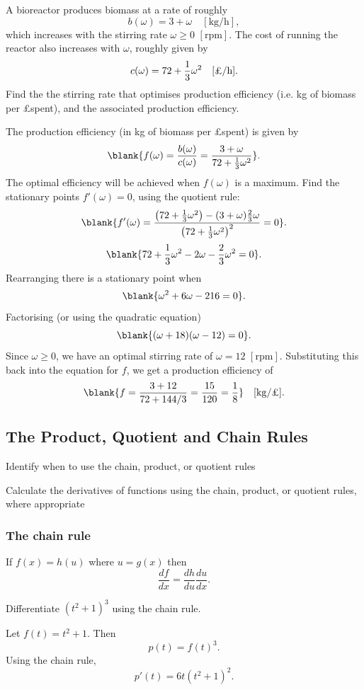 \begin{example}[Video]
A bioreactor produces biomass at a rate of roughly
\[
b(\omega)=3+\omega \quad [\mathrm{kg/h}],
\]
which increases with the stirring rate $\omega\geq0$ $[\mathrm{rpm}]$.
The cost of running the reactor also increases with $\omega$, roughly given by
\[
c(\omega)=72+\frac{1}{3}\omega^2 \quad [\text{\pounds}/\mathrm{h}].
\]
Find the the stirring rate that optimises production efficiency (i.e. kg of biomass per \pounds spent), and the associated production efficiency.
\end{example}
\begin{solution}
The production efficiency (in kg of biomass per \pounds spent) is given by
\[
\blank{f(\omega)=\frac{b(\omega)}{c(\omega)}=\frac{3+\omega}{72+\frac{1}{3}\omega^2}}.
\]
The optimal efficiency will be achieved when $f(\omega)$ is a maximum.
Find the stationary points $f'(\omega)=0$, using the quotient rule:
\[
\blank{f'(\omega)=\frac{\left(72+\frac{1}{3}\omega^2\right)-(3+\omega)\frac{2}{3}\omega}{\left(72+\frac{1}{3}\omega^2\right)^2}=0}.
\]
\[
\blank{72+\frac{1}{3}\omega^2-2\omega-\frac{2}{3}\omega^2=0}.
\]
Rearranging there is a stationary point when
\[
\blank{\omega^2+6\omega-216=0}.
\]
Factorising (or using the quadratic equation)
\[
\blank{(\omega+18)(\omega-12)=0}.
\]
Since $\omega\geq0$, we have an optimal stirring rate of $\omega=12$ $[\mathrm{rpm}]$.
Substituting this back into the equation for $f$, we get a production efficiency of
\[
\blank{f=\frac{3+12}{72+144/3}=\frac{15}{120}=\frac{1}{8}}\quad [\mathrm{kg}/\text{\pounds}].
\]
\end{solution}

\subsection{The Product, Quotient and Chain Rules}
\begin{learningoutcomes}
\item Identify when to use the chain, product, or quotient rules
\item Calculate the derivatives of functions using the chain, product, or quotient rules, where appropriate
\end{learningoutcomes}
\subsubsection{The chain rule}
If $f(x)=h(u)$ where $u=g(x)$ then
\[
\frac{df}{dx}=\frac{dh}{du}\frac{du}{dx}.
\]
\begin{example}[DIY]
Differentiate $(t^2+1)^3$ using the chain rule.
\end{example}
\begin{blanksol}
Let $f(t)=t^2+1$.
Then
\[
p(t)=f(t)^3.
\]
Using the chain rule,
\[
p'(t)=6t(t^2+1)^2.
\]
\end{blanksol}

